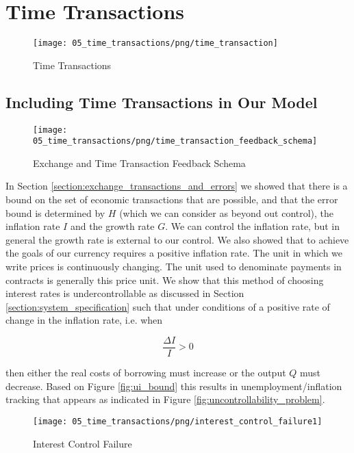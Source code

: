 \section{Time Transactions}
\label{section:time_transactions}

\begin{figure}[H]
\centering
\texttt{[image: 05\_time\_transactions/png/time\_transaction]}
\caption{Time Transactions}
\label{fig:time_transactions2}
\end{figure}

\subsection{Including Time Transactions in Our Model}

\begin{figure}[H]
\centering
\texttt{[image: 05\_time\_transactions/png/time\_transaction\_feedback\_schema]}
\caption{Exchange and Time Transaction Feedback Schema}
\label{fig:exchange_and_time_transaction_schema1}
\end{figure}

In Section \ref{section:exchange_transactions_and_errors} we showed that there is a bound on the set of
economic transactions that are possible, and that the error bound is determined by $H$ (which we can
consider as beyond out control), the inflation rate $I$ and the growth rate $G$. We can control the
inflation rate, but in general the growth rate is external to our control. We also showed that to
achieve the goals of our currency requires a positive inflation rate. The unit in which we write
prices is continuously changing. The unit used to denominate payments in contracts is generally this
price unit. We show that this method of choosing interest rates is undercontrollable as discussed in
Section \ref{section:system_specification} such that under conditions of a positive rate of change
in the inflation rate, i.e. when

\[
    \frac {\Delta I} I > 0
\]

then either the real costs of borrowing must increase or the output $Q$ must decrease. Based on   
Figure \ref{fig:ui_bound} this results in unemployment/inflation tracking that appears as indicated
in Figure \ref{fig:uncontrollability_problem}.

\begin{figure}[H]
\centering
\texttt{[image: 05\_time\_transactions/png/interest\_control\_failure1]}
\caption{Interest Control Failure}
\label{fig:interest_control_failure}
\end{figure}

